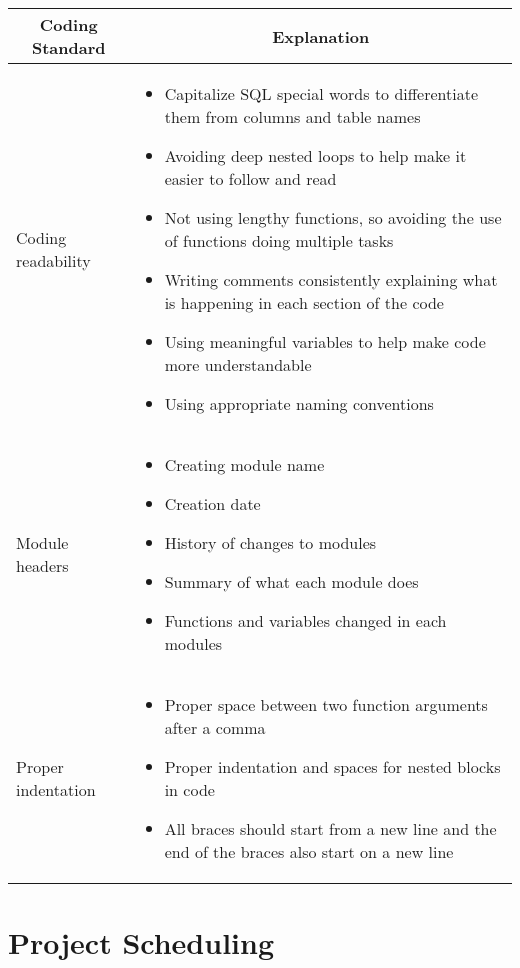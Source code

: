 \documentclass{article}
\begin{document}
\begin{table}[H]
	\centering
	\begin{tabular}{|p{4cm}|p{8cm}|}
	\hline
	\multicolumn{1}{|c|}{\textbf{Coding Standard}} & \multicolumn{1}{c|}{\textbf{Explanation}} 
	\\ \hline
	Coding readability
	&  
	\begin{itemize}
		\item Capitalize SQL special words to differentiate them from columns and table names
		\item Avoiding deep nested loops to help make it easier to follow and read
		\item Not using lengthy functions, so avoiding the use of functions doing multiple tasks
		\item Writing comments consistently explaining what is happening in each section of the code
		\item Using meaningful variables to help make code more understandable
		\item Using appropriate naming conventions
	\end{itemize}                                 
	\\ \hline
	Module headers
	&  
	\begin{itemize}
		\item Creating module name
		\item Creation date
		\item History of changes to modules
		\item Summary of what each module does
		\item Functions and variables changed in each modules
	\end{itemize} 
                             
	\\ \hline
	Proper indentation
	&
	\begin{itemize}
		\item Proper space between two function arguments after a comma
		\item Proper indentation and spaces for nested blocks in code
		\item All braces should start from a new line and the end of the braces also start on a new line
	\end{itemize}
	                             
	\\ \hline
	\end{tabular}
\end{table}

\section{Project Scheduling}

\end{document}
